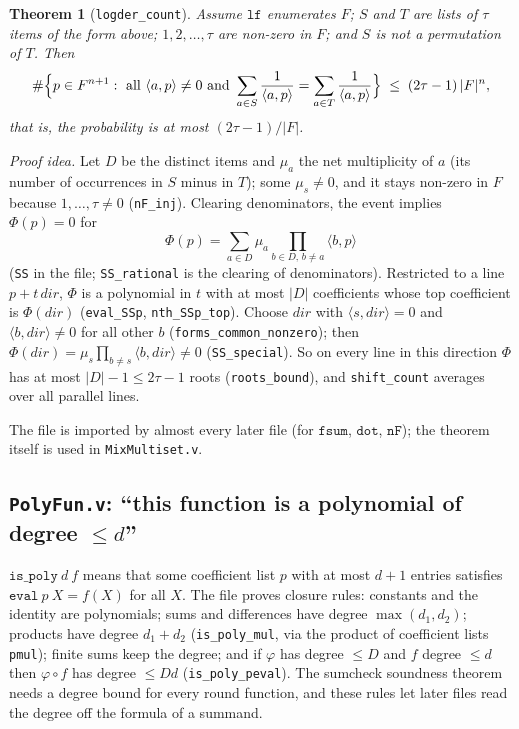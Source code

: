 \documentclass[11pt,a4paper]{article}
\newcommand{\ip}[2]{\langle #1, #2\rangle}
\theoremstyle{definition}
\theoremstyle{plain}
\newtheorem{theorem}[definition]{Theorem}
\begin{document}
\begin{theorem}[\texttt{logder\_count}]
Assume $\mathtt{lf}$ enumerates $F$; $S$ and $T$ are lists of $\tau$ items of the form above;
$1,2,\dots,\tau$ are non-zero in $F$; and $S$ is not a permutation of $T$. Then
\[
  \#\Bigl\{p\in F^{n+1} :\ \text{all } \ip{a}{p}\ne 0 \text{ and }
  \sum_{a\in S}\frac{1}{\ip{a}{p}}=\sum_{a\in T}\frac{1}{\ip{a}{p}}\Bigr\}\;\le\;(2\tau-1)\,|F|^n,
\]
that is, the probability is at most $(2\tau-1)/|F|$.
\end{theorem}

\emph{Proof idea.} Let $D$ be the distinct items and $\mu_a$ the net multiplicity of $a$ (its
number of occurrences in $S$ minus in $T$); some $\mu_s\ne 0$, and it stays non-zero in $F$ because
$1,\dots,\tau\ne0$ (\texttt{nF\_inj}). Clearing denominators, the event implies $\Phi(p)=0$ for
\[
  \Phi(p)=\sum_{a\in D}\mu_a\prod_{b\in D,\,b\ne a}\ip{b}{p}
\]
(\texttt{SS} in the file; \texttt{SS\_rational} is the clearing of denominators). Restricted to a
line $p+t\,\mathit{dir}$, $\Phi$ is a polynomial in $t$ with at most $|D|$ coefficients whose top
coefficient is $\Phi(\mathit{dir})$ (\texttt{eval\_SSp}, \texttt{nth\_SSp\_top}). Choose $\mathit{dir}$
with $\ip{s}{\mathit{dir}}=0$ and $\ip{b}{\mathit{dir}}\ne0$ for all other $b$
(\texttt{forms\_common\_nonzero}); then $\Phi(\mathit{dir})=\mu_s\prod_{b\ne s}\ip{b}{\mathit{dir}}\ne0$
(\texttt{SS\_special}). So on every line in this direction $\Phi$ has at most $|D|-1\le 2\tau-1$ roots
(\texttt{roots\_bound}), and \texttt{shift\_count} averages over all parallel lines.

The file is imported by almost every later file (for $\mathtt{fsum}$, $\mathtt{dot}$, $\mathtt{nF}$);
the theorem itself is used in \texttt{MixMultiset.v}.

\subsection{\texttt{PolyFun.v}: ``this function is a polynomial of degree $\le d$''}

$\mathtt{is\_poly}\ d\ f$ means that some coefficient list $p$ with at most $d+1$ entries satisfies
$\mathtt{eval}\ p\ X=f(X)$ for all $X$. The file proves closure rules: constants and the identity
are polynomials; sums and differences have degree $\max(d_1,d_2)$; products have degree $d_1+d_2$
(\texttt{is\_poly\_mul}, via the product of coefficient lists \texttt{pmul}); finite sums keep the
degree; and if $\varphi$ has degree $\le D$ and $f$ degree $\le d$ then $\varphi\circ f$ has degree
$\le Dd$ (\texttt{is\_poly\_peval}). The sumcheck soundness theorem needs a degree bound for every
round function, and these rules let later files read the degree off the formula of a summand.
\end{document}
